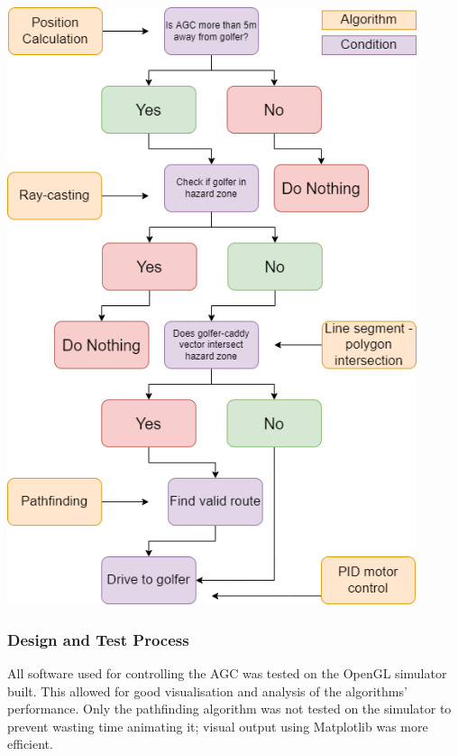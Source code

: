 \documentclass[11pt,landscape]{article}
\newenvironment{Figure}
  {\par\medskip\noindent\minipage{\linewidth}}
  {\endminipage\par\medskip}
\begin{document}
\begin{multicols}{3}
\begin{Figure}
\begin{mdframed}
\begin{center}
        \includegraphics[width=0.9\textwidth]{control_loop.png}
    \end{center}
\end{mdframed}
\label{fig:control_loop}
\end{Figure}
\subsubsection{Design and Test Process}
All software used for controlling the AGC was tested on the OpenGL simulator
built. This allowed for good visualisation and analysis of the algorithms'
performance. Only the pathfinding algorithm was not tested on the simulator to
prevent wasting time animating it; visual output using Matplotlib was more
efficient.


\end{multicols}
\end{document}
